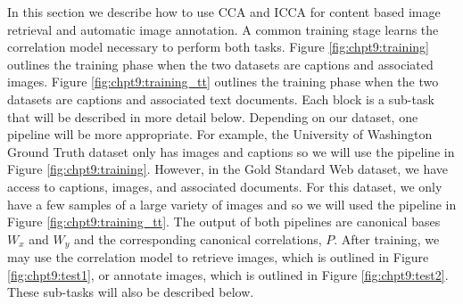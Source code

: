 In this section we describe how to use CCA and ICCA for content based image retrieval and
automatic image annotation. A common training stage learns the correlation model necessary
to perform both tasks. Figure \ref{fig:chpt9:training} outlines the training phase when the two
datasets are captions and associated images. Figure \ref{fig:chpt9:training_tt} outlines the
training phase when the two datasets are captions and associated text documents. Each
block is a sub-task that will be described in more detail below. Depending on our dataset,
one pipeline will be more appropriate. For example, the University of Washington Ground
Truth dataset only has images and captions so we will use the pipeline in Figure
\ref{fig:chpt9:training}. However, in the Gold Standard Web dataset, we have access to captions,
images, and associated documents. For this dataset, we only have a few samples of a large
variety of images and so we will used the pipeline in Figure \ref{fig:chpt9:training_tt}. The
output of both pipelines are canonical bases $W_x$ and $W_y$ and the corresponding
canonical correlations, $P$. After training, we may use the correlation model to retrieve
images, which is outlined in Figure \ref{fig:chpt9:test1}, or annotate images, which is outlined
in Figure \ref{fig:chpt9:test2}. These sub-tasks will also be described below.

